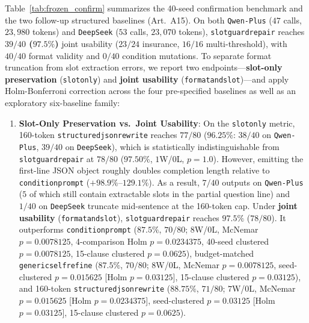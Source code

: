 \documentclass[10pt,twocolumn]{article}
\renewcommand{\_}{\textunderscore\allowbreak}
\begin{document}
Table~\ref{tab:frozen_confirm} summarizes the 40-seed confirmation benchmark and the two follow-up structured baselines (Art.~A15). On both \texttt{Qwen-Plus} ($47$ calls, $23{,}980$ tokens) and \texttt{DeepSeek} ($53$ calls, $23{,}070$ tokens), \texttt{slot\_guard\_repair} reaches \textbf{$39/40$ ($97.5\%$)} joint usability ($23/24$ insurance, $16/16$ multi-threshold), with $40/40$ format validity and $0/40$ condition mutations. To separate format truncation from slot extraction errors, we report two endpoints---\textbf{slot-only preservation} (\texttt{slot\_only}) and \textbf{joint usability} (\texttt{format\_and\_slot})---and apply Holm-Bonferroni correction across the four pre-specified baselines as well as an exploratory six-baseline family:
\begin{enumerate}[leftmargin=*,nosep]
  \item \textbf{Slot-Only Preservation vs.\ Joint Usability}: On the \texttt{slot\_only} metric, 160-token \texttt{structured\_json\_rewrite} reaches $77/80$ ($96.25\%$: $38/40$ on \texttt{Qwen-Plus}, $39/40$ on \texttt{DeepSeek}), which is statistically indistinguishable from \texttt{slot\_guard\_repair} at $78/80$ ($97.50\%$, $1$W/$0$L, $p=1.0$). However, emitting the first-line JSON object roughly doubles completion length relative to \texttt{condition\_prompt} ($+98.9\%\text{--}129.1\%$). As a result, $7/40$ outputs on \texttt{Qwen-Plus} ($5$ of which still contain extractable slots in the partial question line) and $1/40$ on \texttt{DeepSeek} truncate mid-sentence at the 160-token cap. Under \textbf{joint usability} (\texttt{format\_and\_slot}), \texttt{slot\_guard\_repair} reaches $97.5\%$ ($78/80$). It outperforms \texttt{condition\_prompt} ($87.5\%$, $70/80$; $8$W/$0$L, McNemar $p=0.0078125$, 4-comparison Holm $p=0.0234375$, 40-seed clustered $p=0.0078125$, 15-clause clustered $p=0.0625$), budget-matched \texttt{generic\_self\_refine} ($87.5\%$, $70/80$; $8$W/$0$L, McNemar $p=0.0078125$, seed-clustered $p=0.015625$ [Holm $p=0.03125$], 15-clause clustered $p=0.03125$), and 160-token \texttt{structured\_json\_rewrite} ($88.75\%$, $71/80$; $7$W/$0$L, McNemar $p=0.015625$ [Holm $p=0.0234375$], seed-clustered $p=0.03125$ [Holm $p=0.03125$], 15-clause clustered $p=0.0625$).

\end{enumerate}
\end{document}

